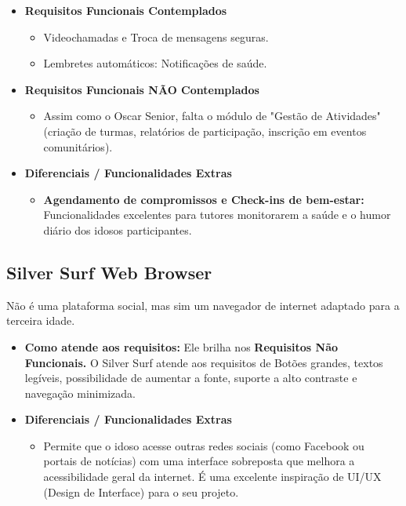 \begin{itemize}
    \item \textbf{Requisitos Funcionais Contemplados}
        \begin{itemize}
            \item Videochamadas e Troca de mensagens seguras.
            \item Lembretes automáticos: Notificações de saúde.
        \end{itemize}
    \item \textbf{Requisitos Funcionais NÃO Contemplados}
        \begin{itemize}
            \item Assim como o Oscar Senior, falta o módulo de "Gestão de Atividades" (criação de turmas, relatórios de participação, inscrição em eventos comunitários).
        \end{itemize}
    \item \textbf{Diferenciais / Funcionalidades Extras}
        \begin{itemize}
            \item \textbf{Agendamento de compromissos e Check-ins de bem-estar:} Funcionalidades excelentes para tutores monitorarem a saúde e o humor diário dos idosos participantes.
        \end{itemize}
\end{itemize}

\subsection{Silver Surf Web Browser}
Não é uma plataforma social, mas sim um navegador de internet adaptado para a terceira idade.

\begin{itemize}
    \item \textbf{Como atende aos requisitos:} Ele brilha nos \textbf{Requisitos Não Funcionais.} O Silver Surf atende aos requisitos de Botões grandes, textos legíveis, possibilidade de aumentar a fonte, suporte a alto contraste e navegação minimizada.
    \item \textbf{Diferenciais / Funcionalidades Extras}
        \begin{itemize}
            \item Permite que o idoso acesse outras redes sociais (como Facebook ou portais de notícias) com uma interface sobreposta que melhora a acessibilidade geral da internet. É uma excelente inspiração de UI/UX (Design de Interface) para o seu projeto.
        \end{itemize}
\end{itemize}